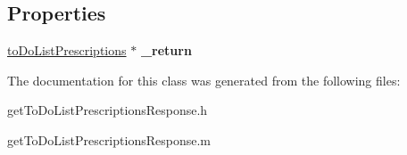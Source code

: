 \subsection*{Properties}
\begin{DoxyCompactItemize}
\item 
\hypertarget{interfaceget_to_do_list_prescriptions_response_a0fb5a559bc413509b2d5b5a97e202678}{}\hyperlink{interfaceto_do_list_prescriptions}{to\+Do\+List\+Prescriptions} $\ast$ {\bfseries \+\_\+return}\label{interfaceget_to_do_list_prescriptions_response_a0fb5a559bc413509b2d5b5a97e202678}

\end{DoxyCompactItemize}


The documentation for this class was generated from the following files\+:\begin{DoxyCompactItemize}
\item 
get\+To\+Do\+List\+Prescriptions\+Response.\+h\item 
get\+To\+Do\+List\+Prescriptions\+Response.\+m\end{DoxyCompactItemize}
